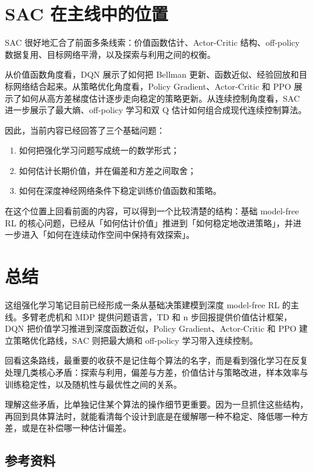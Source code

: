 \documentclass{article}
\begin{document}
\section*{SAC 在主线中的位置}

SAC 很好地汇合了前面多条线索：价值函数估计、Actor-Critic 结构、off-policy 数据复用、目标网络平滑，以及探索与利用之间的权衡。

从价值函数角度看，DQN 展示了如何把 Bellman 更新、函数近似、经验回放和目标网络结合起来。从策略优化角度看，Policy Gradient、Actor-Critic 和 PPO 展示了如何从高方差梯度估计逐步走向稳定的策略更新。从连续控制角度看，SAC 进一步展示了最大熵、off-policy 学习和双 Q 估计如何组合成现代连续控制算法。

因此，当前内容已经回答了三个基础问题：

\begin{enumerate}
  \item 如何把强化学习问题写成统一的数学形式；
  \item 如何估计长期价值，并在偏差和方差之间取舍；
  \item 如何在深度神经网络条件下稳定训练价值函数和策略。
\end{enumerate}

在这个位置上回看前面的内容，可以得到一个比较清楚的结构：基础 model-free RL 的核心问题，已经从「如何估计价值」推进到「如何稳定地改进策略」，并进一步进入「如何在连续动作空间中保持有效探索」。

\section*{总结}

这组强化学习笔记目前已经形成一条从基础决策建模到深度 model-free RL 的主线。多臂老虎机和 MDP 提供问题语言，TD 和 n 步回报提供价值估计框架，DQN 把价值学习推进到深度函数近似，Policy Gradient、Actor-Critic 和 PPO 建立策略优化路线，SAC 则把最大熵和 off-policy 学习带入连续控制。

回看这条路线，最重要的收获不是记住每个算法的名字，而是看到强化学习在反复处理几类核心矛盾：探索与利用，偏差与方差，价值估计与策略改进，样本效率与训练稳定性，以及随机性与最优性之间的关系。

理解这些矛盾，比单独记住某个算法的操作细节更重要。因为一旦抓住这些结构，再回到具体算法时，就能看清每个设计到底是在缓解哪一种不稳定、降低哪一种方差，或是在补偿哪一种估计偏差。

\subsection*{参考资料}
\end{document}
